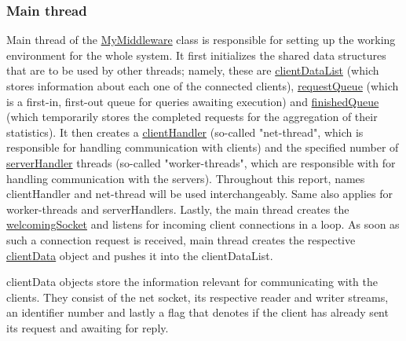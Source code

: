 \documentclass[11pt,a4paper]{article}
\begin{document}
\subsubsection{Main thread} \label{sec:overview-mainthread}
Main thread of the \underline{MyMiddleware} class is responsible for setting up the working environment for the whole system. It first initializes the shared data structures that are to be used by other threads; namely, these are \underline{clientDataList} (which stores information about each one of the connected clients), \underline{requestQueue} (which is a first-in, first-out queue for queries awaiting execution) and \underline{finishedQueue} (which temporarily stores the completed requests for the aggregation of their statistics). It then creates a \underline{clientHandler} (so-called "net-thread", which is responsible for handling communication with clients) and the specified number of \underline{serverHandler} threads (so-called "worker-threads", which are responsible with for handling communication with the servers). Throughout this report, names clientHandler and net-thread will be used interchangeably. Same also applies for worker-threads and serverHandlers. Lastly, the main thread creates the \underline{welcomingSocket} and listens for incoming client connections in a loop. As soon as such a connection request is received, main thread creates the respective \underline{clientData} object and pushes it into the clientDataList.
\par
clientData objects store the information relevant for communicating with the clients. They consist of the net socket, its respective reader and writer streams, an identifier number and lastly a flag that denotes if the client has already sent its request and awaiting for reply.
\end{document}
